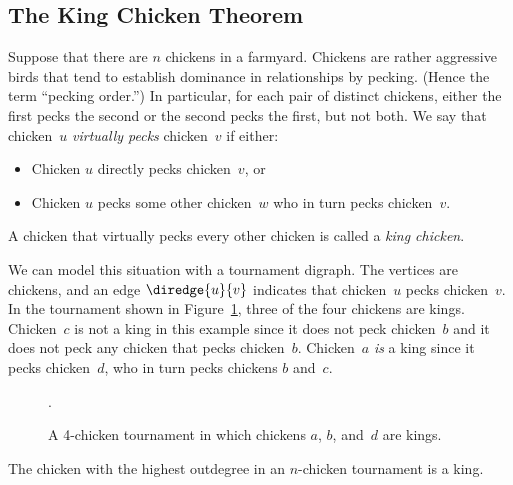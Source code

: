 \subsection{The King Chicken Theorem}

Suppose that there are $n$ chickens in a farmyard.  Chickens are
rather aggressive birds that tend to establish dominance in
relationships by pecking.  (Hence the term ``pecking order.'')  In
particular, for each pair of distinct chickens, either the first pecks
the second or the second pecks the first, but not both.  We say that
chicken~$u$ \emph{virtually pecks} chicken~$v$ if either:
\begin{itemize}

\item Chicken $u$ directly pecks chicken~$v$, or

\item Chicken $u$ pecks some other chicken~$w$ who in turn pecks
  chicken~$v$.

\end{itemize}
A chicken that virtually pecks every other chicken is called a
\emph{king chicken}.

We can model this situation with a tournament digraph.  The vertices
are chickens, and an edge $\diredge{u}{v}$ indicates that chicken~$u$ pecks
chicken~$v$.  In the tournament shown in Figure~\ref{fig:6EE3}, three
of the four chickens are kings.  Chicken~$c$ is not a king in this
example since it does not peck chicken~$b$ and it does not peck any
chicken that pecks chicken~$b$.  Chicken~$a$ \emph{is} a king since it
pecks chicken~$d$, who in turn pecks chickens $b$ and~$c$.

\begin{figure}


\caption{A 4-chicken tournament in which chickens $a$, $b$, and~$d$
  are kings.}

\label{fig:6EE3}.

\end{figure}

\begin{theorem}\label{thm:king_chicken}
The chicken with the highest outdegree in an $n$-chicken tournament is
a king.
\end{theorem}

